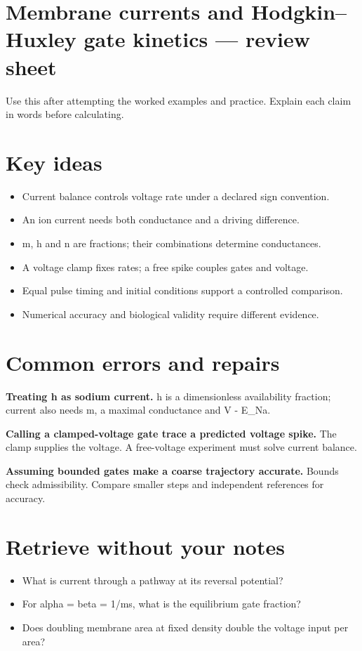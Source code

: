 \documentclass[11pt,letterpaper]{article}
\theoremstyle{definition}\newtheorem{definition}{Definition}\newtheorem{example}{Example}
\numberwithin{equation}{section}
\begin{document}
\section*{Membrane currents and Hodgkin--Huxley gate kinetics --- review sheet}
Use this after attempting the worked examples and practice. Explain each claim in words before calculating.

\section*{Key ideas}
\begin{itemize}
\item Current balance controls voltage rate under a declared sign convention.
\item An ion current needs both conductance and a driving difference.
\item m, h and n are fractions; their combinations determine conductances.
\item A voltage clamp fixes rates; a free spike couples gates and voltage.
\item Equal pulse timing and initial conditions support a controlled comparison.
\item Numerical accuracy and biological validity require different evidence.
\end{itemize}
\section*{Common errors and repairs}
\textbf{Treating h as sodium current.} h is a dimensionless availability fraction; current also needs m, a maximal conductance and V - E\_Na.

\textbf{Calling a clamped-voltage gate trace a predicted voltage spike.} The clamp supplies the voltage. A free-voltage experiment must solve current balance.

\textbf{Assuming bounded gates make a coarse trajectory accurate.} Bounds check admissibility. Compare smaller steps and independent references for accuracy.

\section*{Retrieve without your notes}
\begin{itemize}
\item What is current through a pathway at its reversal potential?
\item For alpha =\allowbreak{} beta =\allowbreak{} 1/ms, what is the equilibrium gate fraction?
\item Does doubling membrane area at fixed density double the voltage input per area?
\end{itemize}
\end{document}
